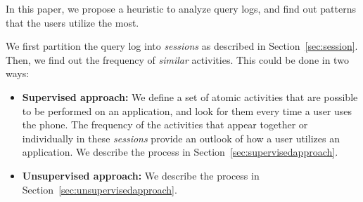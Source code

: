 



In this paper, we propose a heuristic to analyze query logs, and find out patterns that the users utilize the most.

We first partition the query log into \emph{sessions} as described in Section~\ref{sec:session}. Then, we find out the frequency of \emph{similar} activities. This could be done in two ways: 

\begin{itemize}
	\item \textbf{Supervised approach:} We define a set of atomic activities that are possible to be performed on an application, and look for them every time a user uses the phone. The frequency of the activities that appear together or individually in these \emph{sessions} provide an outlook of how a user utilizes an application. We describe the process in Section~\ref{sec:supervisedapproach}.
	\item \textbf{Unsupervised approach:}  We describe the process in Section~\ref{sec:unsupervisedapproach}.
\end{itemize}


